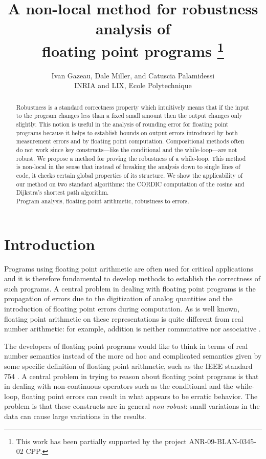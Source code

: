 \documentclass[copyright,creativecommons]{eptcs}
\title{A non-local method for robustness analysis of\\ floating point programs
      \thanks{This work has been partially supported by the project ANR-09-BLAN-0345-02  CPP.}}
\author{Ivan Gazeau, Dale Miller, and Catuscia Palamidessi\\
INRIA and LIX, Ecole Polytechnique}
\begin{document}
\maketitle

\begin{abstract}
Robustness is a standard correctness property which intuitively means
that if the input to the program changes less than a fixed small
amount then the output changes only slightly.
This notion is useful in the analysis of rounding error for floating
point programs because it helps to establish bounds on output errors
introduced by both measurement errors and by floating point
computation.
Compositional methods often do not work since key constructs---like
the conditional and the while-loop---are not robust.
We propose a method for proving the robustness of a while-loop.
This method is non-local in the sense that instead of breaking the
analysis down to single lines of code, it checks certain global
properties of its structure.
We show the applicability of our method on two standard algorithms:
the CORDIC computation of the cosine and Dijkstra's shortest path
algorithm.\\ 

 Program analysis,
floating-point arithmetic,
robustness to errors.
\end{abstract}


\section{Introduction}





Programs using floating point arithmetic are often used for critical
applications and it is therefore fundamental to develop methods to
establish the correctness of such programs.  A central problem in
dealing with floating point programs is the propagation of errors due
to the digitization of analog quantities and the introduction of
floating point errors during computation.  As is well known, floating
point arithmetic on these representations is quite different from real
number arithmetic: for example, addition is neither commutative nor
associative \cite{goldberg91surveys}.




The developers of floating point programs would like to think in terms
of real number semantics instead of the more ad hoc and complicated
semantics given by some specific definition of floating point
arithmetic, such as the IEEE standard 754 \cite{ieee08}.  A central
problem in trying to reason about floating point programs is that in
dealing with non-continuous operators such as the conditional and the
while-loop, floating point errors can result in what appears to be
erratic behavior.  The problem is that these constructs are in general
\emph{non-robust}: small variations in the data can cause large
variations in the results.
\end{document}
